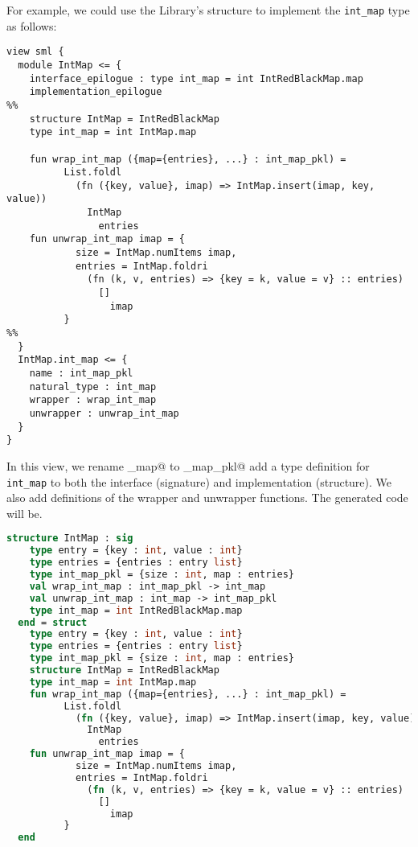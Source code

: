 For example, we could use the \smlnj{} Library's \lstinline@IntRedBlackMap@ structure
to implement the \lstinline!int_map! type as follows:
\begin{code}\begin{lstlisting}[language=ASDL]
view sml {
  module IntMap <= {
    interface_epilogue : type int_map = int IntRedBlackMap.map
    implementation_epilogue
%%
    structure IntMap = IntRedBlackMap
    type int_map = int IntMap.map

    fun wrap_int_map ({map={entries}, ...} : int_map_pkl) =
          List.foldl
            (fn ({key, value}, imap) => IntMap.insert(imap, key, value))
              IntMap
                entries
    fun unwrap_int_map imap = {
            size = IntMap.numItems imap,
            entries = IntMap.foldri
              (fn (k, v, entries) => {key = k, value = v} :: entries)
                []
                  imap
          }
%%
  }
  IntMap.int_map <= {
    name : int_map_pkl
    natural_type : int_map
    wrapper : wrap_int_map
    unwrapper : unwrap_int_map
  }
}
\end{lstlisting}\end{code}%
In this view, we rename \lstinline@int_map@ to \lstinline@int_map_pkl@ add a type
definition for \lstinline!int_map! to both the interface
(signature) and implementation (structure).
We also add definitions of the wrapper and unwrapper functions.
The generated code will be.
\begin{code}\begin{lstlisting}[language=SML]
structure IntMap : sig
    type entry = {key : int, value : int}
    type entries = {entries : entry list}
    type int_map_pkl = {size : int, map : entries}
    val wrap_int_map : int_map_pkl -> int_map
    val unwrap_int_map : int_map -> int_map_pkl
    type int_map = int IntRedBlackMap.map
  end = struct
    type entry = {key : int, value : int}
    type entries = {entries : entry list}
    type int_map_pkl = {size : int, map : entries}
    structure IntMap = IntRedBlackMap
    type int_map = int IntMap.map
    fun wrap_int_map ({map={entries}, ...} : int_map_pkl) =
          List.foldl
            (fn ({key, value}, imap) => IntMap.insert(imap, key, value))
              IntMap
                entries
    fun unwrap_int_map imap = {
            size = IntMap.numItems imap,
            entries = IntMap.foldri
              (fn (k, v, entries) => {key = k, value = v} :: entries)
                []
                  imap
          }
  end
\end{lstlisting}\end{code}%


